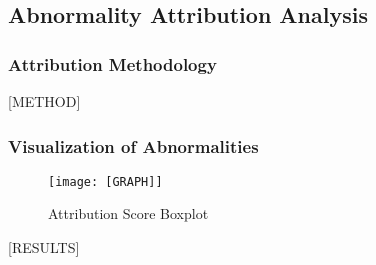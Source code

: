 \subsection{Abnormality Attribution Analysis}

\subsubsection{Attribution Methodology}

[METHOD]

\subsubsection{Visualization of Abnormalities}

\begin{figure}[H]
    \centering
    \vspace{-1.5cm}
    \texttt{[image: [GRAPH]]}
    \caption{Attribution Score Boxplot}
\end{figure}

[RESULTS]
